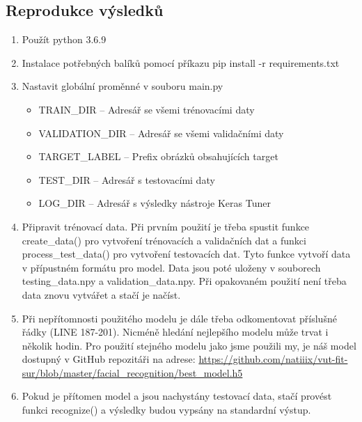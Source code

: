 \documentclass[a4paper,11pt]{article}
\begin{document}
		\subsection{Reprodukce výsledků}
			\begin{enumerate}
				\item Použít python 3.6.9
				\item Instalace potřebných balíků pomocí příkazu pip install -r requirements.txt
				\item Nastavit globální proměnné v souboru main.py
					\begin{itemize}
						\item TRAIN\_DIR -- Adresář se všemi trénovacími daty
						\item VALIDATION\_DIR -- Adresář se všemi validačními daty
						\item TARGET\_LABEL -- Prefix obrázků obsahujících target
						\item TEST\_DIR -- Adresář s testovacími daty
						\item LOG\_DIR -- Adresář s výsledky nástroje Keras Tuner
					\end{itemize}
				\item Připravit trénovací data. Při prvním použití je třeba spustit funkce create\_data() pro vytvoření trénovacích a validačních dat a funkci process\_test\_data() pro vytvoření testovacích dat. Tyto funkce vytvoří data v přípustném formátu pro model. Data jsou poté uloženy v souborech testing\_data.npy a validation\_data.npy. Při opakovaném použití není třeba data znovu vytvářet a stačí je načíst.
				\item Při nepřítomnosti použitého modelu je dále třeba odkomentovat příslušné řádky (LINE 187-201). Nicméně hledání nejlepšího modelu může trvat i několik hodin. Pro použití stejného modelu jako jsme použili my, je náš model dostupný v GitHub repozitáři na adrese: \url{https://github.com/natiiix/vut-fit-sur/blob/master/facial_recognition/best_model.h5}
				\item Pokud je přítomen model a jsou nachystány testovací data, stačí provést funkci recognize() a výsledky budou vypsány na standardní výstup. 
			\end{enumerate}
\end{document}
